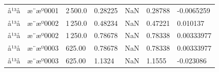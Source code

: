 \documentclass[UTF8,10pt,a4paper,fontset=fandol]{ctexart}
\newcommand{\fieldvalue}[1]{#1}
\begin{document}
\begin{center}
\begin{center}
\begin{tabularx}{\textwidth}{l l l l l l l}
å¹³å &
\fieldvalue{æ¨æº0001} &
\fieldvalue{2\,500.0} &
\fieldvalue{0.28225} &
\fieldvalue{NaN} &
\fieldvalue{0.28788} &
\fieldvalue{-0.0065259} \\

å¹³å &
\fieldvalue{æ¨æº0002} &
\fieldvalue{1\,250.0} &
\fieldvalue{0.48234} &
\fieldvalue{NaN} &
\fieldvalue{0.47221} &
\fieldvalue{0.010137} \\

å¹³å &
\fieldvalue{æ¨æº0002} &
\fieldvalue{1\,250.0} &
\fieldvalue{0.78678} &
\fieldvalue{NaN} &
\fieldvalue{0.78338} &
\fieldvalue{0.00333977} \\

å¹³å &
\fieldvalue{æ¨æº0003} &
\fieldvalue{625.00} &
\fieldvalue{0.78678} &
\fieldvalue{NaN} &
\fieldvalue{0.78338} &
\fieldvalue{0.00333977} \\

å¹³å &
\fieldvalue{æ¨æº0003} &
\fieldvalue{625.00} &
\fieldvalue{1.1324} &
\fieldvalue{NaN} &
\fieldvalue{1.1555} &
\fieldvalue{-0.023086} \\


\end{tabularx}
\end{center}
\end{center}
\end{document}
